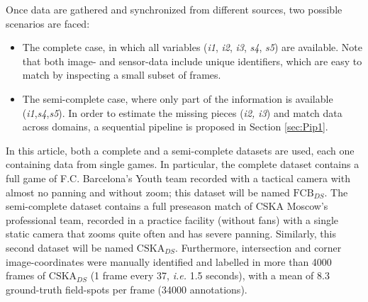 \documentclass{article}
\begin{document}
Once data are gathered and synchronized from different sources, two possible scenarios are faced:
\begin{itemize}
    \item The complete case, in which all variables (\textit{i1}, \textit{i2}, \textit{i3}, \textit{s4}, \textit{s5}) are available. Note that both image- and sensor-data include unique identifiers, which are easy to match by inspecting a small subset of frames.
    \item The semi-complete case, where only part of the information is available (\textit{i1},\textit{s4},\textit{s5}). In order to estimate the missing pieces (\textit{i2, i3}) and match data across domains, a sequential pipeline is proposed in Section \ref{sec:Pip1}.
\end{itemize}
In this article, both a complete and a semi-complete datasets are used, each one containing data from single games. In particular, the complete dataset contains a full game of F.C. Barcelona's Youth team recorded with a tactical camera with almost no panning and without zoom; this dataset will be named $\text{FCB}_{DS}$. The semi-complete dataset contains a full preseason match of CSKA Moscow's professional team, recorded in a practice facility (without fans) with a single static camera that zooms quite often and has severe panning.  Similarly, this second dataset will be named $\text{CSKA}_{DS}$. Furthermore, intersection and corner image-coordinates were manually identified and labelled in more than 4000 frames of $\text{CSKA}_{DS}$ (1 frame every 37, \textit{i.e.} 1.5 seconds), with a mean of 8.3 ground-truth field-spots per frame (34000 annotations).\\
\end{document}

